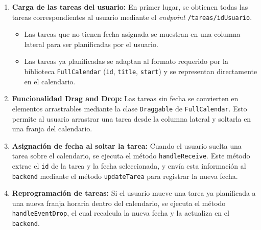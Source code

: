 \vspace{0.5em}
\begin{enumerate}
  \item \textbf{Carga de las tareas del usuario:}  
  En primer lugar, se obtienen todas las tareas correspondientes al usuario mediante el \textit{endpoint} \texttt{/tareas/{idUsuario}}.  
  \begin{itemize}
    \item Las tareas que no tienen fecha asignada se muestran en una columna lateral para ser planificadas por el usuario.
    \item Las tareas ya planificadas se adaptan al formato requerido por la biblioteca \texttt{FullCalendar} \cite{fullcalendar-docs}(\texttt{id}, \texttt{title}, \texttt{start}) y se representan directamente en el calendario.
  \end{itemize}

  \item \textbf{Funcionalidad Drag and Drop:}  
  Las tareas sin fecha se convierten en elementos arrastrables mediante la clase \texttt{Draggable} de \texttt{FullCalendar}. Esto permite al usuario arrastrar una tarea desde la columna lateral y soltarla en una franja del calendario.

  \item \textbf{Asignación de fecha al soltar la tarea:}  
  Cuando el usuario suelta una tarea sobre el calendario, se ejecuta el método \texttt{handleReceive}. Este método extrae el \texttt{id} de la tarea y la fecha seleccionada, y envía esta información al \texttt{backend} mediante el método \texttt{updateTarea} para registrar la nueva fecha.

  \item \textbf{Reprogramación de tareas:}  
  Si el usuario mueve una tarea ya planificada a una nueva franja horaria dentro del calendario, se ejecuta el método \texttt{handleEventDrop}, el cual recalcula la nueva fecha y la actualiza en el \texttt{backend}.
\end{enumerate}
\newpage
